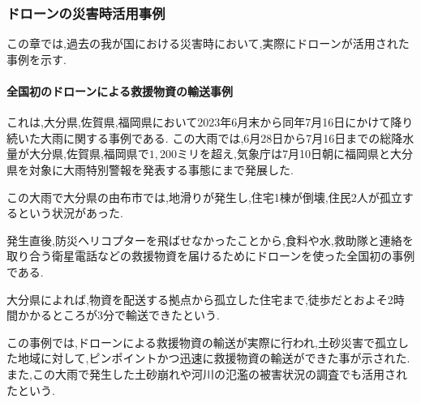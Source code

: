 \documentclass{article}[jsarticle]
\begin{document}
\subsubsection{ドローンの災害時活用事例}
この章では,過去の我が国における災害時において,実際にドローンが活用された事例を示す.
\paragraph{全国初のドローンによる救援物資の輸送事例}
これは,大分県,佐賀県,福岡県において2023年6月末から同年7月16日にかけて降り続いた大雨に関する事例である.
この大雨では,6月28日から7月16日までの総降水量が大分県,佐賀県,福岡県で$1,200$ミリを超え,気象庁は7月10日朝に福岡県と大分県を対象に大雨特別警報を発表する事態にまで発展した.\par
この大雨で大分県の由布市では,地滑りが発生し,住宅1棟が倒壊,住民2人が孤立するという状況があった.\par 
発生直後,防災ヘリコプターを飛ばせなかったことから,食料や水,救助隊と連絡を取り合う衛星電話などの救援物資を届けるためにドローンを使った全国初の事例である.\par 
大分県によれば,物資を配送する拠点から孤立した住宅まで,徒歩だとおよそ2時間かかるところが3分で輸送できたという.\par
この事例では,ドローンによる救援物資の輸送が実際に行われ,土砂災害で孤立した地域に対して,ピンポイントかつ迅速に救援物資の輸送ができた事が示された.
また,この大雨で発生した土砂崩れや河川の氾濫の被害状況の調査でも活用されたという.
\end{document}
